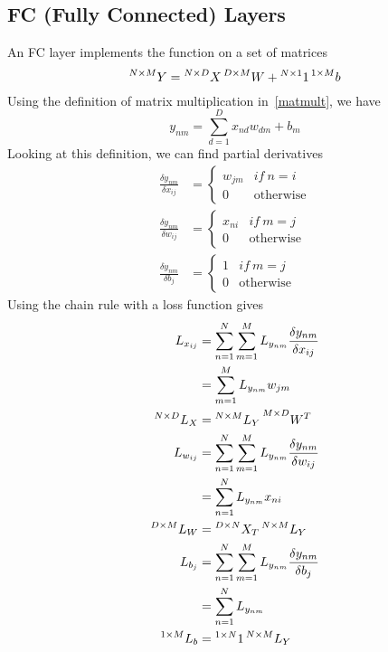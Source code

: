 \documentclass{article}
\numberwithin{equation}{subsection}
\begin{document}
\subsection{FC (Fully Connected) Layers}
An FC layer implements the function on a set of matrices
\begin{equation}
    \prescript{N\times M}{}{Y} = \prescript{N\times D}{}{X}\prescript{D\times M}{}{W} + \prescript{N\times1}{}{1}\prescript{1\times M}{}{b}
\end{equation}
Using the definition of matrix multiplication in~\ref{matmult}, we have
\begin{equation}
y_{nm} = \sum_{d=1}^D x_{nd} w_{dm}+b_m
\end{equation}
Looking at this definition, we can find partial derivatives 
\begin{align}
    \frac{\delta y_{nm}}{\delta x_{ij}} &= \begin{cases}
        w_{jm} & if\ n=i\\
        0 & \text{otherwise}
    \end{cases}\\
    \frac{\delta y_{nm}}{\delta w_{ij}} &= \begin{cases}
        x_{ni} & if\ m=j\\
        0 & \text{otherwise}
    \end{cases}\\
    \frac{\delta y_{nm}}{\delta b_{j}} &= \begin{cases}
        1 & if\ m=j\\
        0 & \text{otherwise}
    \end{cases}
\end{align}
Using the chain rule with a loss function gives
\begin{align}
    L_{x_{ij}} &= \sum_{n=1}^N\sum_{m=1}^M L_{y_{nm}} \frac{\delta y_{nm}}{\delta x_{ij}}\\
    &= \sum_{m=1}^M L_{y_{nm}} w_{jm}\\
    \prescript{N\times D}{}{L_X} &= \prescript{N\times M}{}{L_Y}\prescript{M\times D}{}{W^T}\\
    L_{w_{ij}} &= \sum_{n=1}^N\sum_{m=1}^M L_{y_{nm}} \frac{\delta y_{nm}}{\delta w_{ij}}\\
    &= \sum_{n=1}^N L_{y_{nm}} x_{ni}\\
    \prescript{D\times M}{}{L_W} &= \prescript{D\times N}{}{X_T}\prescript{N\times M}{}{L_Y}\\
    L_{b_{j}} &= \sum_{n=1}^N\sum_{m=1}^M L_{y_{nm}} \frac{\delta y_{nm}}{\delta b_{j}}\\
    &= \sum_{n=1}^N L_{y_{nm}}\\
    \prescript{1\times M}{}{L_b} &= \prescript{1\times N}{}{1}\prescript{N\times M}{}{L_Y}
\end{align}
\end{document}
